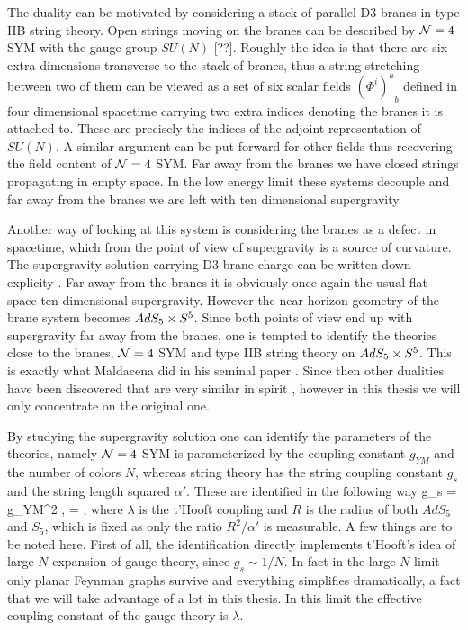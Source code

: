 The duality can be motivated by considering a stack of parallel D3 branes in type IIB string theory. 
Open strings moving on the branes can be described by $\mathcal{N}=4$ SYM with the gauge group $SU(N)$ [??]. 
Roughly the idea is that there are six extra dimensions transverse to the stack of branes, thus a string stretching between two of them can be viewed as a set of six scalar fields ${(\Phi^i)^a}_b$ defined in four dimensional spacetime carrying two extra indices denoting the branes it is attached to. 
These are precisely the indices of the adjoint representation of $SU(N)$.
A similar argument can be put forward for other fields thus recovering the field content of $\mathcal{N}=4$ SYM.
Far away from the branes we have closed strings propagating in empty space. 
In the low energy limit these systems decouple and far away from the branes we are left with ten dimensional supergravity.

Another way of looking at this system is considering the branes as a defect in spacetime, which from the point of view of supergravity is a source of curvature. 
The supergravity solution carrying D3 brane charge can be written down explicity \cite{Horowitz:1991cd}.
Far away from the branes it is obviously once again the usual flat space ten dimensional supergravity.
However the near horizon geometry of the brane system becomes $AdS_5 \times S^5$.
Since both points of view end up with supergravity far away from the branes, one is tempted to identify the theories close to the branes, $\mathcal{N}=4$ SYM and type IIB string theory on $AdS_5 \times S^5$. 
This is exactly what Maldacena did in his seminal paper \cite{Maldacena:1997re}. Since then other dualities have been discovered that are very similar in spirit \cite{Aharony:2008ug}, however in this thesis we will only concentrate on the original one.

By studying the supergravity solution one can identify the parameters of the theories, namely $\mathcal{N}=4$ SYM is parameterized by the coupling constant $g_{YM}$ and the number of colors $N$, whereas string theory has the string coupling constant $g_s$ and the string length squared $\alpha'$. 
These are identified in the following way
\pi g_s = g_{YM}^2 \equiv {}, \;\;\;\;\;\;\;  = \lambda,
\eeq
where $\lambda$ is the t'Hooft coupling and $R$ is the radius of both $AdS_5$ and $S_5$, which is fixed as only the ratio $R^2/\alpha'$ is measurable.
A few things are to be noted here. First of all, the identification directly implements t'Hooft's idea of large $N$ expansion of gauge theory, since $g_s \sim 1/N$. 
In fact in the large $N$ limit only planar Feynman graphs survive and everything simplifies dramatically, a fact that we will take advantage of a lot in this thesis.
In this limit the effective coupling constant of the gauge theory is $\lambda$. 


